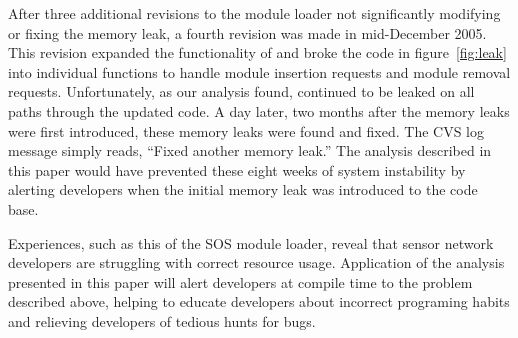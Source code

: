 After three additional revisions to the module loader not significantly
modifying or fixing the memory leak, a fourth revision was made in
mid-December 2005.  
%
This revision expanded the functionality of  and broke the code
in figure~\ref{fig:leak} into individual functions to handle module insertion
requests and module removal requests.
%
Unfortunately, as our analysis found,  continued to be leaked on
all paths through the updated code.
%
A day later, two months after the memory leaks were first introduced, these
memory leaks were found and fixed.
%
The CVS log message simply reads, ``Fixed another memory leak.''
%
The analysis described in this paper would have prevented these eight weeks of
system instability by alerting developers when the initial memory leak was
introduced to the code base.



Experiences, such as this of the SOS module loader, reveal that sensor network
developers are struggling with correct resource usage.
%
Application of the analysis presented in this paper will alert developers at
compile time to the problem described above, helping to educate developers
about incorrect programing habits and relieving developers of tedious hunts
for bugs.


